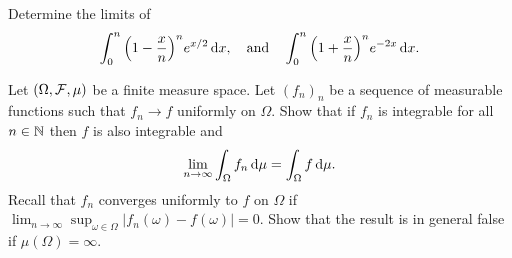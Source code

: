 \begin{problem} Determine the limits of 
    \begin{equation*}
        \int_0^n \Big(1-\frac{x}{n}\Big)^n e^{x/2}\,\mathrm{d} x,\quad\text{and}\quad \int_0^n \Big(1+\frac{x}{n}\Big)^n e^{-2x}\,\mathrm{d} x.
    \end{equation*}
\end{problem}

\begin{problem} Let $(\Omega,\mathcal F,\mu)$ be a finite measure space. Let $(f_n)_n$ be a sequence of measurable functions such that $f_n\to f$ uniformly on $\Omega$. Show that if $f_n$ is integrable for all $n\in\mathbb N$ then $f$ is also integrable and
    \begin{equation*}
        \lim_{n\to\infty} \int_\Omega f_n \,\mathrm{d} \mu = \int_\Omega f \,\mathrm{d} \mu. 
    \end{equation*}
Recall that $f_n$ converges uniformly to $f$ on $\Omega$ if $\lim_{n\to\infty} \sup_{\omega\in \Omega} |f_n(\omega)-f(\omega)| = 0$.
Show that the result is in general false if $\mu(\Omega) = \infty$.
\end{problem}